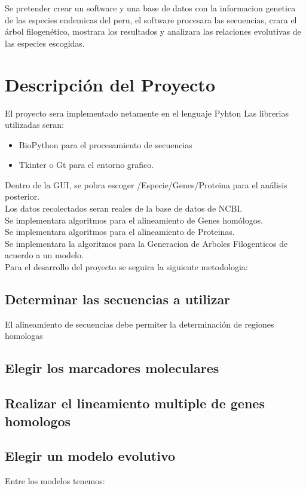 \documentclass[a4paper]{article}
\begin{document}
Se pretender crear un software y una base de datos con la informacion genetica de las especies endemicas del peru, el software procesara las secuencias, crara el árbol filogenético, mostrara los resultados y analizara las relaciones evolutivas de las especies escogidas.

\section{Descripción del Proyecto}

El proyecto sera implementado netamente en el lenguaje Pyhton
Las librerias utilizadas seran:
\begin{itemize}
\item BioPython para el procesamiento de secuencias
\item Tkinter o Gt para el entorno grafico.
\end{itemize}
Dentro de la GUI, se pobra escoger /Especie/Genes/Proteina para el análisis posterior.\\
Los datos recolectados seran reales de la base de datos de NCBI.\\
Se implementara algoritmos para el alineamiento de Genes homólogos.\\
Se implementara algoritmos para el alineamiento de Proteinas.\\
Se implementara la algoritmos para la Generacion de Arboles Filogenticos de acuerdo a un modelo.\\

\noindent Para el desarrollo del proyecto se seguira la siguiente metodologia:

\subsection{Determinar las secuencias a utilizar}
El alineamiento de secuencias debe permiter la determinación de regiones homologas 
\subsection{Elegir los marcadores moleculares}
\subsection{Realizar el lineamiento multiple de genes homologos}
\subsection{Elegir un modelo evolutivo}
Entre los modelos tenemos:
\end{document}
